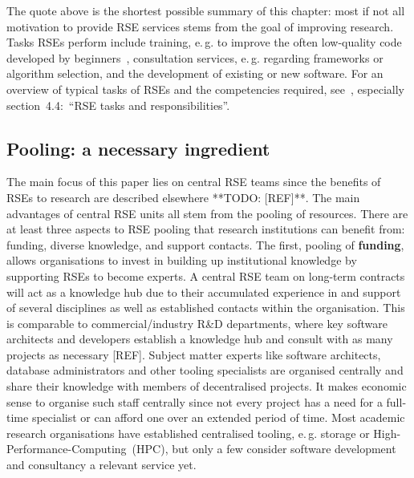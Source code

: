 \documentclass[a4paper]{article}
\makeatletter
\newcommand*{\eg}{e.\,g.\@\xspace}
\makeatother
\begin{document}
The quote above is the shortest possible summary of this chapter: most if not all motivation to provide RSE services stems from the goal of improving research.
Tasks RSEs perform include training, \eg{} to improve the often low-quality code developed by beginners~\autocite{Ostlund2023}, consultation services, \eg{} regarding frameworks or algorithm selection, and the development of existing or new software.
For an overview of typical tasks of RSEs and the competencies required, see~\autocite{goth_foundational_competencies_2024}, especially section\ 4.4:\ “RSE tasks and responsibilities”.

\subsection{Pooling: a necessary ingredient}
The main focus of this paper lies on central RSE teams since the benefits of RSEs to research are described elsewhere **TODO: [REF]**.
The main advantages of central RSE units all stem from the pooling of resources.
There are at least three aspects to RSE pooling that research institutions can benefit from: funding, diverse knowledge, and support contacts.
The first, pooling of \textbf{funding}, allows organisations to invest in building up institutional knowledge by supporting RSEs to become experts.
A central RSE team on long-term contracts will act as a knowledge hub due to their accumulated experience in and support of several disciplines as well as established contacts within the organisation.
This is comparable to commercial/industry R\&D departments, where key software architects and developers establish a knowledge hub and consult with as many projects as necessary  [REF].
Subject matter experts like software architects, database administrators and other tooling specialists are organised centrally and share their knowledge with members of decentralised projects.
It makes economic sense to organise such staff centrally since not every project has a need for a full-time specialist or can afford one over an extended period of time.
Most academic research organisations have established centralised tooling, \eg{} storage or High-Performance-Computing\ (HPC), but only a few consider software development and consultancy a relevant service yet.
\end{document}
